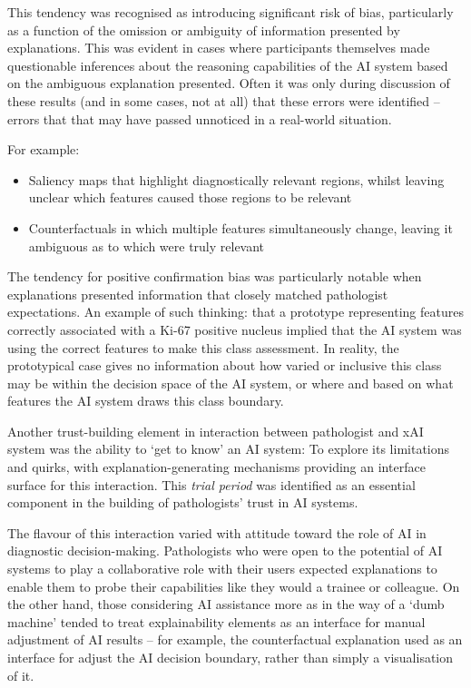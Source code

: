 This tendency was recognised as introducing significant risk of bias, particularly as a function of the omission or ambiguity of information presented by explanations. This was evident in cases where participants themselves made questionable inferences about the reasoning capabilities of the AI system based on the ambiguous explanation presented. Often it was only during discussion of these results (and in some cases, not at all) that these errors were identified -- errors that that may have passed unnoticed in a real-world situation. 

For example:

\begin{itemize}
    \item Saliency maps that highlight diagnostically relevant regions, whilst leaving unclear which features caused those regions to be relevant
    \item Counterfactuals in which multiple features simultaneously change, leaving it ambiguous as to which were truly relevant
\end{itemize}

The tendency for positive confirmation bias was particularly notable when explanations presented information that closely matched pathologist expectations. An example of such thinking: that a prototype representing features correctly associated with a Ki-67 positive nucleus implied that the AI system was using the correct features to make this class assessment. In reality, the prototypical case gives no information about how varied or inclusive this class may be within the decision space of the AI system, or where and based on what features the AI system draws this class boundary.


Another trust-building element in interaction between pathologist and xAI system was the ability to `get to know' an AI system: To explore its limitations and quirks, with explanation-generating mechanisms providing an interface surface for this interaction. This \textit{trial period} was identified as an essential component in the building of pathologists' trust in AI systems. 

The flavour of this interaction varied with attitude toward the role of AI in diagnostic decision-making. Pathologists who were open to the potential of AI systems to play a collaborative role with their users expected explanations to enable them to probe their capabilities like they would a trainee or colleague. On the other hand, those considering AI assistance more as in the way of a `dumb machine' tended to treat explainability elements as an interface for manual adjustment of AI results -- for example, the counterfactual explanation used as an interface for adjust the AI decision boundary, rather than simply a visualisation of it.

